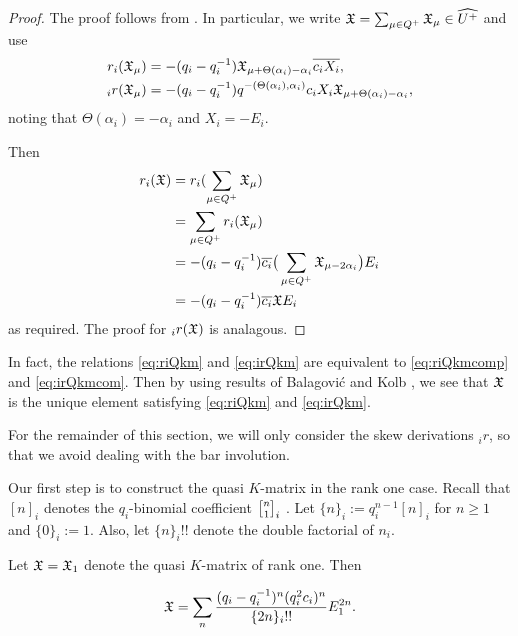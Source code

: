 \documentclass[a4 paper, 10pt]{article}
\begin{document}
\begin{proof}
 The proof follows from \cite[Prop 3.1]{a-BK15}. In particular, we write $\mathfrak{X} = \sum_{\mu \in Q^+} \mathfrak{X}_{\mu} \in \widehat{U^+}$ and use \cite[Eqns 6.2, 6.3]{a-BK15} 
\begin{align}
	r_{i}(\mathfrak{X}_{\mu}) 	&= -(q_i - q_i^{-1}) \mathfrak{X}_{\mu+\Theta(\alpha_i)-\alpha_i} \overline{c_iX_i}, \label{eq:riQkmcomp}\\
	{}_{i}r(\mathfrak{X}_{\mu})	&= -(q_i - q_i^{-1}) q^{-(\Theta(\alpha_i),\alpha_i)}c_iX_i \mathfrak{X}_{\mu+\Theta(\alpha_i)-\alpha_i}, \label{eq:irQkmcom} 
\end{align} 
  noting that $\Theta(\alpha_i) = -\alpha_i$ and $X_i = -E_i$. 
 
 Then
 	\begin{align*}
 		r_{i}(\mathfrak{X}) 	&= r_{i}(\sum_{\mu \in Q^+} \mathfrak{X}_{\mu} ) \\
 						&= \sum_{\mu \in Q^+} r_{i}(\mathfrak{X}_{\mu}) \\
 						&= -(q_i - q_i^{-1})\overline{c_i}\big(\sum_{\mu \in Q^+} \mathfrak{X}_{\mu - 2\alpha_i}\big) E_i \\
 						&= -(q_i - q_i^{-1})\overline{c_i} \mathfrak{X} E_i   
 	\end{align*}
 as required. The proof for ${}_{i}r(\mathfrak{X})$ is analagous.
\end{proof}

\begin{remark}
	In fact, the relations \eqref{eq:riQkm} and \eqref{eq:irQkm} are equivalent to \eqref{eq:riQkmcomp} and \eqref{eq:irQkmcom}. Then by using results of Balagovi\'{c} and Kolb \cite[Theorem 6.10]{a-BK15}, we see that $\mathfrak{X}$ is the unique element satisfying \eqref{eq:riQkm} and \eqref{eq:irQkm}.
\end{remark}

For the remainder of this section, we will only consider the skew derivations $_{i}r$, so that we avoid dealing with the bar involution. 

Our first step is to construct the quasi $K$-matrix in the rank one case. Recall that $[n]_i$ denotes the $q_i$-binomial coefficient $\qbin{n}{1}_i $ \cite[1.3.3]{b-Lusztig94}. Let $\{ n \}_i := q_i^{n-1}[n]_i$ for $n \geq 1$ and $\{ 0 \}_i := 1$. Also, let $\{n\}_i!!$ denote the double factorial of ${n}_i$. 

\begin{lemma} \label{rk1Qkm}
	Let $\mathfrak{X} = \mathfrak{X}_{1}$ denote the quasi $K$-matrix of rank one. Then
		
		\begin{equation} \label{eq:rk1Qkm}
			\mathfrak{X} = \sum_{n} \dfrac{(q_i - q_i^{-1})^n(q_i^2c_i)^n}{ \{2n\}_{i}!! } E_1^{2n}.
		\end{equation}
\end{lemma}
\end{document}
